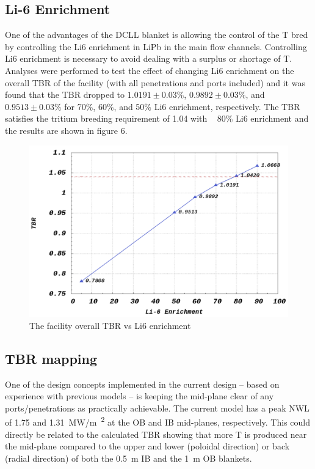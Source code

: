 \documentclass[12pt, letterpaper]{elsarticle}
\begin{document}
\subsection{Li-6 Enrichment} \label{Li-6 Enrichment}
One of the advantages of the DCLL blanket is allowing the control of the T bred by controlling the  Li6 enrichment in LiPb in the main flow channels. Controlling Li6 enrichment is necessary to avoid dealing with a surplus or shortage of T. Analyses were performed to test the effect of changing Li6 enrichment on the overall TBR of the facility (with all penetrations and ports included) and it was found that the TBR dropped to $1.0191\pm 0.03\%$, $0.9892\pm 0.03\%$, and $0.9513\pm 0.03\%$ for 70\%, 60\%, and 50\% Li6  enrichment, respectively. The TBR satisfies the tritium breeding requirement of 1.04 with ~ 80\% Li6 enrichment and the results are shown in figure 6.
\begin{figure}[h!]
  \centering
  \includegraphics[scale=0.2]{../plots/Li6_enrichment.png}
  \caption{The facility overall TBR vs Li6 enrichment}
  \label{fig:Li6_enrichment}
\end{figure}

\subsection{TBR mapping} \label{TBR mapping}
One of the design concepts implemented in the current design – based on experience with previous models – is keeping the mid-plane clear of any ports/penetrations as practically achievable. The current model has a peak NWL of 1.75 and \SI{1.31}{MW/m\textsuperscript{2}} at the OB and IB mid-planes, respectively. This could directly be related to the calculated TBR showing that more T is produced near the mid-plane compared to the upper and lower (poloidal direction) or back (radial direction) of both the \SI{0.5}{m} IB and the \SI{1}{m} OB blankets.\vspace{5mm}
\end{document}
